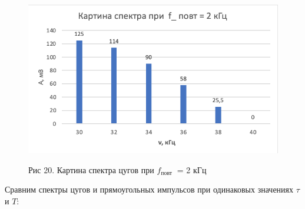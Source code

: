 \documentclass[a4paper,12pt]{article} %
\begin{document}
\begin{figure}[p]
	\centering
	\includegraphics[width=0.8\linewidth]{"f2"}
 \begin{center}
                    {Рис 20.} Картина спектра цугов при $f_{\text {повт }}$ = 2 кГц\\
                    \end{center}
	\label{fig:1-100}
\end{figure}

\newpage
Сравним спектры цугов и прямоугольных импульсов при одинаковых значениях $\tau$ и $T$:
\end{document}
